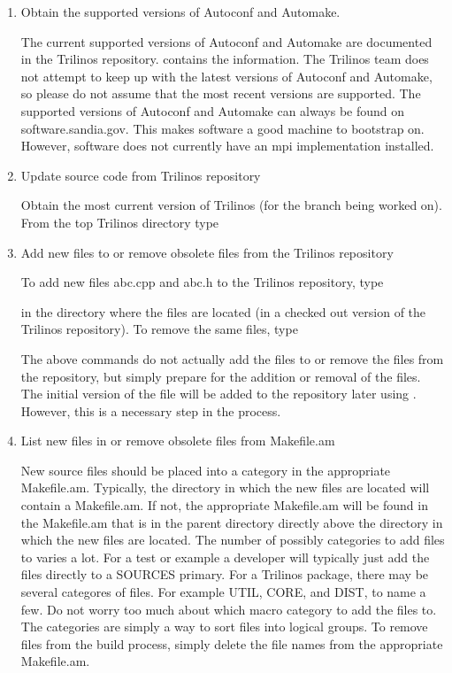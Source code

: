 \documentclass[12pt,strict]{TrilinosDevGuide}
\begin{document}
\begin{enumerate}
\item Obtain the supported versions of Autoconf and Automake.

The current supported versions of Autoconf and Automake are documented in 
the Trilinos repository.  
 contains the 
information.  The Trilinos team does not attempt to keep up with the latest 
versions of Autoconf and Automake, so please do not assume that the most 
recent versions are supported.  The supported versions of Autoconf and 
Automake can always be found on software.sandia.gov.  This makes software a 
good machine to bootstrap on.  However, software does not currently have an
mpi implementation installed.

\item Update source code from Trilinos repository

Obtain the most current version of Trilinos (for the branch being worked on).  
From the top Trilinos directory type


\item Add new files to or remove obsolete files from the Trilinos repository

To add new files abc.cpp and abc.h to the Trilinos repository, type


in the directory where the files are located (in a checked out version of the 
Trilinos repository).  To remove the same files, type


The above commands do not actually add the files to or remove the files from 
the repository, but simply prepare for the addition or removal of the files.  
The initial version of the file will be added to the repository later using 
.  However, this is a necessary step in the process.

\item List new files in or remove obsolete files from Makefile.am

New source files should be placed into a category in the appropriate 
Makefile.am.  Typically, the directory in which the new files are located will 
contain a Makefile.am.  If not, the appropriate Makefile.am will be found in 
the Makefile.am that is in the parent directory directly above the directory 
in which the new files are located.  The number of possibly categories to add 
files to varies a lot.  For a test or example a developer will typically just 
add the files directly to a SOURCES primary.  For a Trilinos package, there 
may be several categores of files.  For example UTIL, CORE, and DIST, to name 
a few.  Do not worry too much about which macro category to add the files to.  
The categories are simply a way to sort files into logical groups.  To remove 
files from the build process, simply delete the file names from the 
appropriate Makefile.am.


\end{enumerate}
\end{document}
